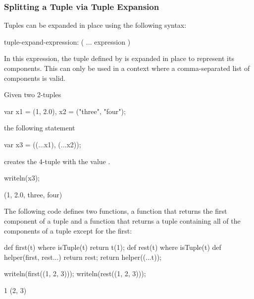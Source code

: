 \subsubsection{Splitting a Tuple via Tuple Expansion}
\label{Tuple_Expansion}

Tuples can be expanded in place using the following syntax:
\begin{syntax}
tuple-expand-expression:
  ( ... expression )
\end{syntax}
In this expression, the tuple defined by  is expanded
in place to represent its components.  This can only be used in a
context where a comma-separated list of components is valid.

\begin{example}
\begin{chapelpre}
\end{chapelpre}
Given two 2-tuples
\begin{chapel}
var x1 = (1, 2.0), x2 = ("three", "four");
\end{chapel}
the following statement
\begin{chapel}
var x3 = ((...x1), (...x2));
\end{chapel}
creates the 4-tuple  with the value .
\begin{chapelpost}
writeln(x3);
\end{chapelpost}
\begin{chapeloutput}
(1, 2.0, three, four)
\end{chapeloutput}
\end{example}

\begin{example}
\begin{chapelpre}
\end{chapelpre}
The following code defines two functions, a function  that
returns the first component of a tuple and a function  that
returns a tuple containing all of the components of a tuple except for
the first:
\begin{chapel}
def first(t) where isTuple(t) {
  return t(1);
}
def rest(t) where isTuple(t) {
  def helper(first, rest...)
    return rest;
  return helper((...t));
}
\end{chapel}
\begin{chapelpost}
writeln(first((1, 2, 3)));
writeln(rest((1, 2, 3)));
\end{chapelpost}
\begin{chapeloutput}
1
(2, 3)
\end{chapeloutput}
\end{example}

